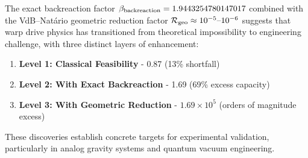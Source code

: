 \documentclass[11pt]{article}
\begin{document}
The exact backreaction factor $\beta_{\rm backreaction}=1.9443254780147017$ combined with the VdB–Natário geometric reduction factor $\mathcal{R}_{\rm geo}\approx10^{-5}\text{–}10^{-6}$ suggests that warp drive physics has transitioned from theoretical impossibility to engineering challenge, with three distinct layers of enhancement:

\begin{enumerate}
\item \textbf{Level 1: Classical Feasibility} - 0.87 (13\% shortfall)
\item \textbf{Level 2: With Exact Backreaction} - 1.69 (69\% excess capacity) 
\item \textbf{Level 3: With Geometric Reduction} - $1.69\times10^5$ (orders of magnitude excess)
\end{enumerate}

These discoveries establish concrete targets for experimental validation, particularly in analog gravity systems and quantum vacuum engineering.
\end{document}
